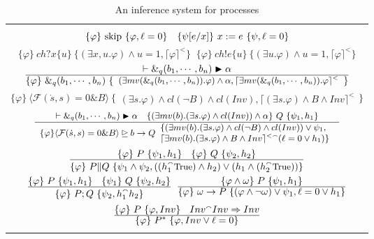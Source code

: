 \documentclass{llncs}
\newcommand{\pskip}{\textmd{skip}}
\newcommand{\evolution}[3]{\langle \mathcal{#1}(\dot{#2},#2)=0 \& #3\rangle}
\newcommand{\bexempt}[3]{#1 \unrhd #2 \rightarrow #3}
\newcommand{\fracN}[2]{\frac{\small \textstyle #1}{\small \textstyle #2}}
\newcommand{\ltrue}{\textmd{True}}
\newcommand{\chop}{\smallfrown}
\newcommand{\typeb}[2]{\vdash #1 \blacktriangleright #2}
\newcommand{\inference}[3]{\{#1\} \ #2\ \{#3\}}
\newcommand{\dceil}[1]{\lceil #1 \rceil}
\newcommand{\close}[1]{cl(#1)}
\newcommand{\Pre}{\varphi}
\newcommand{\Post}{\psi}
\begin{document}
\begin{table}[t]
\small
\centering
\begin{tabular}{c}
\hline \\
$\inference{\Pre}{\pskip}{\Pre, \ell=0} \quad \inference{\Post[e/x]}{x :=e}{\Post, \ell=0}$ \\[0.6em]
$\inference{\Pre}{ch?x\{u\}}{(\exists x, u. \Pre) \wedge u=1, \dceil{\Pre}^<} \ $
$\inference{\Pre}{ch!e\{u\}}{(\exists u. \Pre) \wedge u=1, \dceil{\Pre}^<} $\\[0.6em]
$\fracN{\typeb{\&_q(b_1, \cdots, b_n)}{\alpha}}{\inference{\Pre}{\&_q(b_1, \cdots, b_n)}
{
\begin{array}{l}
(\exists mv(\&_q(b_1, \cdots, b_n)). \Pre) \wedge \alpha,
\dceil{\exists mv(\&_q(b_1, \cdots, b_n)). \Pre}^<
\end{array}}}$
\\[1.2em]
$\inference{\Pre}{\evolution{F}{s}{B}}{
\begin{array}{l}
(\exists s. \Pre) \wedge \close{\neg B} \wedge \close{Inv},
\dceil{(\exists s. \Pre) \wedge B \wedge Inv}^<
\end{array}}$
\\[0.8em]
$\fracN{
\begin{array}{c}
\typeb{\&_q(b_1, \cdots, b_n)}{\alpha} \quad
\inference{(\exists mv(b). (\exists s. \Pre) \wedge \close{Inv}) \wedge \alpha}{Q}{\Post_1, h_1}
\end{array}}
{\begin{array}{l}
 \{\Pre\} \bexempt{\evolution{F}{s}{B}}{b}{Q}
 \begin{array}{l}
  \{(\exists mv(b). (\exists s. \Pre) \wedge \close{\neg B} \wedge \close{Inv}) \vee \Post_1, \\
\dceil{\exists mv(b). (\exists s. \Pre) \wedge B \wedge Inv}^< {}^\chop  (\ell=0 \vee h_1)\}
\end{array}
\end{array}}$
\\[1.2em]
$\fracN{\inference{\Pre}{P}{\Post_1, h_1} \quad \inference{\Pre}{Q}{\Post_2, h_2}}
{\inference{\Pre}{P\|Q}{\Post_1 \wedge \Post_2, ((h_1 ^\chop \ltrue)\wedge h_2) \vee (h_1 \wedge (h_2 ^\chop \ltrue))}} $\\[1.3em]
$\fracN{\inference{\Pre}{P} {\Post_1, h_1}\quad \inference{\Post_1}{Q} {\Post_2, h_2}}{\inference{\Pre}{P; Q}{\Post_2, h_1 ^\chop h_2}}$
\quad
$\fracN{\inference{\Pre \wedge \omega}{P}{\Post_1, h_1}}{\inference{\Pre}{ \omega \rightarrow P}{(\Pre\wedge \neg \omega) \vee \Post_1,  \ell=0\vee h_1}}$ \\[1.3em]
$\fracN{\inference{\Pre}{P}{\Pre, Inv} \quad Inv ^\chop Inv \Rightarrow Inv}{\inference{\Pre}{P^*}{\Pre, Inv \vee \ell=0}}$\\[1.3em]
\hline\\
\end{tabular}
\caption{An inference system for processes}
\label{inferencesystem}

\end{table}
\end{document}
